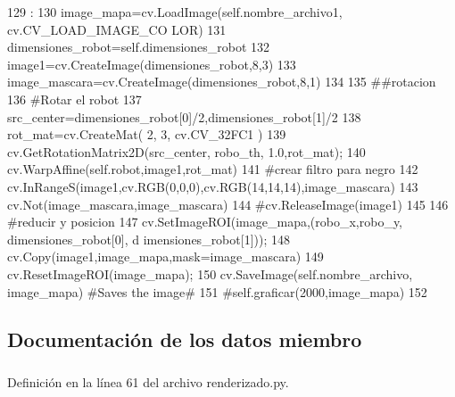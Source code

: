 \begin{DoxyCode}
129                                                                             :
130                 image_mapa=cv.LoadImage(self.nombre_archivo1, cv.CV_LOAD_IMAGE_CO
      LOR)
131                 dimensiones_robot=self.dimensiones_robot
132                 image1=cv.CreateImage(dimensiones_robot,8,3)
133                 image_mascara=cv.CreateImage(dimensiones_robot,8,1)
134                 
135                 ##rotacion
136                 #Rotar el robot
137                 src_center=dimensiones_robot[0]/2,dimensiones_robot[1]/2
138                 rot_mat=cv.CreateMat( 2, 3, cv.CV_32FC1 )
139                 cv.GetRotationMatrix2D(src_center, robo_th, 1.0,rot_mat);
140                 cv.WarpAffine(self.robot,image1,rot_mat)
141                 #crear filtro para negro
142                 cv.InRangeS(image1,cv.RGB(0,0,0),cv.RGB(14,14,14),image_mascara)
143                 cv.Not(image_mascara,image_mascara)
144                 #cv.ReleaseImage(image1)
145                 
146                 #reducir y posicion
147                 cv.SetImageROI(image_mapa,(robo_x,robo_y, dimensiones_robot[0], d
      imensiones_robot[1]));
148                 cv.Copy(image1,image_mapa,mask=image_mascara)
149                 cv.ResetImageROI(image_mapa);
150                 cv.SaveImage(self.nombre_archivo, image_mapa) #Saves the image#
151                 #self.graficar(2000,image_mapa)
152                 

\end{DoxyCode}


\subsection{Documentación de los datos miembro}
\hypertarget{classrenderizado_1_1renderizado_a70a61493b255b1624edf30547356c83e}{
\subsubsection[{dimeniones}]{}}
\label{classrenderizado_1_1renderizado_a70a61493b255b1624edf30547356c83e}


Definición en la línea 61 del archivo renderizado.py.

\hypertarget{classrenderizado_1_1renderizado_ab835e8ffdd4128f40fd35258f3bdcfce}{
\subsubsection[{dimensiones\_\-robot}]{}}
\label{classrenderizado_1_1renderizado_ab835e8ffdd4128f40fd35258f3bdcfce}



